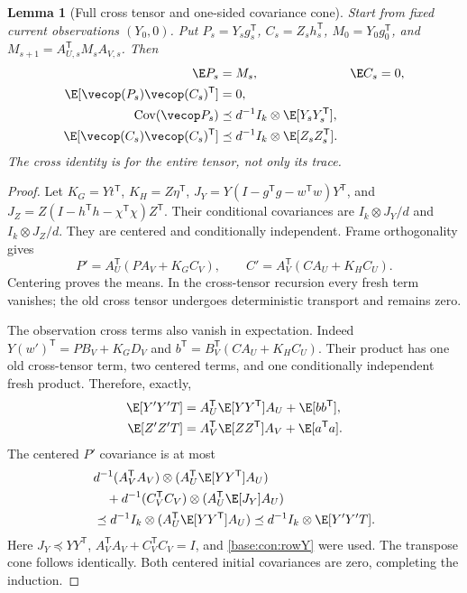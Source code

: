\documentclass[11pt,oneside,openany,a4paper]{book}
\numberwithin{equation}{chapter}
\newtheorem{lemma}[theorem]{Lemma}
\theoremstyle{definition}
\theoremstyle{remark}
\newcommand{\T}{\mathsf T}\newcommand{\Id}{I}
\begin{document}
\begin{lemma}[Full cross tensor and one-sided covariance cone]\label{base:con:restart-cone}
Start from fixed current observations $(Y_0,0)$. Put $P_s=Y_sg_s^\T$, $C_s=Z_sh_s^\T$, $M_0=Y_0g_0^\T$, and $M_{s+1}=A_{U,s}^\T M_sA_{V,s}$. Then
\begin{align}
 \E P_s&=M_s,&\E C_s&=0,\label{base:con:cone-means}\\
 \E[\vecop(P_s)\vecop(C_s)^\T]&=0,\label{base:con:cone-cross}\\
 \operatorname{Cov}(\vecop P_s)&\preceq d^{-1}I_k\otimes\E[Y_sY_s^\T],\label{base:con:cone-P}\\
 \E[\vecop(C_s)\vecop(C_s)^\T]&\preceq d^{-1}I_k\otimes\E[Z_sZ_s^\T].\label{base:con:cone-C}
\end{align}
The cross identity is for the entire tensor, not only its trace.
\end{lemma}
\begin{proof}
Let $K_G=Yt^\T$, $K_H=Z\eta^\T$, $J_Y=Y(I-g^\T g-w^\T w)Y^\T$, and $J_Z=Z(I-h^\T h-\chi^\T\chi)Z^\T$. Their conditional covariances are $I_k\otimes J_Y/d$ and $I_k\otimes J_Z/d$. They are centered and conditionally independent. Frame orthogonality gives
\[
 P'=A_U^\T(PA_V+K_GC_V),\qquad
 C'=A_V^\T(CA_U+K_HC_U).
\]
Centering proves the means. In the cross-tensor recursion every fresh term vanishes; the old cross tensor undergoes deterministic transport and remains zero.

The observation cross terms also vanish in expectation. Indeed
$Y(w')^\T=PB_V+K_GD_V$ and
$b^\T=B_V^\T(CA_U+K_HC_U)$. Their product has one old cross-tensor term, two centered terms, and one conditionally independent fresh product. Therefore, exactly,
\begin{align}
 \E[Y'Y'^\T]&=A_U^\T\E[YY^\T]A_U+\E[bb^\T],\label{base:con:rowY}\\
 \E[Z'Z'^\T]&=A_V^\T\E[ZZ^\T]A_V+\E[a^\T a].\label{base:con:rowZ}
\end{align}
The centered $P'$ covariance is at most
\begin{align*}
 &d^{-1}(A_V^\T A_V)\otimes(A_U^\T\E[YY^\T]A_U)\\
 &\quad+d^{-1}(C_V^\T C_V)\otimes(A_U^\T\E[J_Y]A_U)\\
 &\preceq d^{-1}I_k\otimes(A_U^\T\E[YY^\T]A_U)
 \preceq d^{-1}I_k\otimes\E[Y'Y'^\T].
\end{align*}
Here $J_Y\preceq YY^\T$, $A_V^\T A_V+C_V^\T C_V=I$, and \eqref{base:con:rowY} were used. The transpose cone follows identically. Both centered initial covariances are zero, completing the induction.
\end{proof}
\end{document}
